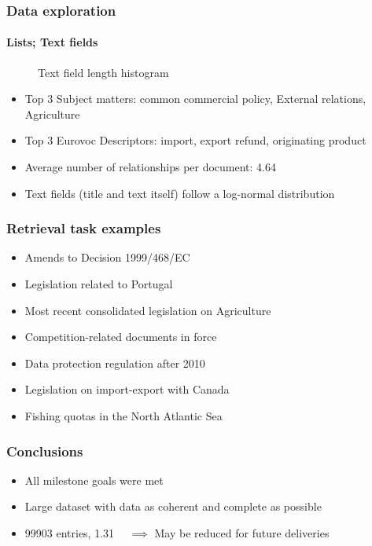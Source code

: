 \documentclass[table]{beamer}
\begin{document}
\begin{frame}
\frametitle{Data exploration}
\framesubtitle{Lists; Text fields}

\begin{minipage}{0.5\textwidth}
\centering
\begin{figure}[h]
    \centering
    
    \caption{Text field length histogram}
\end{figure}
\end{minipage}\hfill
\begin{minipage}{0.5\textwidth}
\begin{itemize}
\item Top 3 Subject matters: common commercial policy, External relations, Agriculture
\item Top 3 Eurovoc Descriptors: import, export refund, originating product
\item Average number of relationships per document: 4.64
\item Text fields (title and text itself) follow a log-normal distribution
\end{itemize}
\end{minipage}

\end{frame}


\begin{frame}
\frametitle{Retrieval task examples}

\begin{itemize}
    \item Amends to Decision 1999/468/EC
    \item Legislation related to Portugal
    \item Most recent consolidated legislation on Agriculture
    \item Competition-related documents in force
    \item Data protection regulation after 2010
    \item Legislation on import-export with Canada
    \item Fishing quotas in the North Atlantic Sea
\end{itemize}

\end{frame}

\begin{frame}
\frametitle{Conclusions}

\begin{itemize}
    \item All milestone goals were met
    \item Large dataset with data as coherent and complete as possible
    \item \SI{99903}{} entries, \SI{1.31}{\giga\byte} $\implies$ May be reduced for future deliveries
\end{itemize}

\end{frame}

%   
%   
\end{document}
